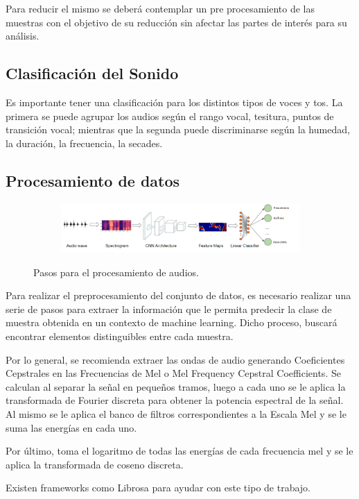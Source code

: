 \documentclass[journal]{IEEEtran}
\begin{document}
Para reducir el mismo se deberá contemplar un pre procesamiento de las muestras con el objetivo de su reducción sin afectar las partes de interés para su análisis\cite{tp}.

\subsection{Clasificación del Sonido}
Es importante tener una clasificación para los distintos tipos de voces y tos. La primera se puede agrupar los audios según el rango vocal, tesitura, puntos de transición vocal; mientras que la segunda puede discriminarse según la humedad, la duración, la frecuencia, la secades\cite{tp}.

\subsection{Procesamiento de datos}
\begin{figure}[H]
\begin{subfigure}[b]{1\columnwidth}
\includegraphics[width=\textwidth]{audiowave_to_classifier}
\end{subfigure}
\caption{Pasos para el procesamiento de audios.}
\end{figure}
Para realizar el preprocesamiento del conjunto de datos, es necesario realizar una serie de pasos para extraer la información que le permita predecir la clase de muestra obtenida en un contexto de machine learning. Dicho proceso, buscará encontrar elementos distinguibles entre cada muestra.

Por lo general, se recomienda extraer las ondas de audio generando Coeﬁcientes Cepstrales en las Frecuencias de Mel o Mel Frequency Cepstral Coeﬃcients. Se calculan al separar la señal en pequeños tramos, luego a cada uno se le aplica la transformada de Fourier discreta para obtener la potencia espectral de la señal. Al mismo se le aplica el banco de filtros correspondientes a la Escala Mel y se le suma las energías en cada uno\cite{fourier}.

Por último, toma el logaritmo de todas las energías de cada frecuencia mel y se le aplica la transformada de coseno discreta.

Existen frameworks como Librosa para ayudar con este tipo de trabajo\cite{librosa}.
\end{document}

